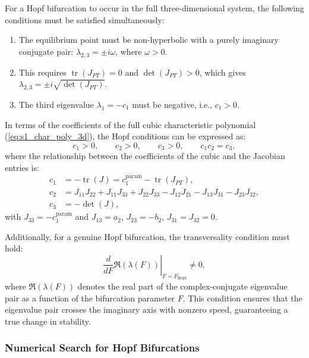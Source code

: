 \documentclass[12pt,a4paper]{article}
\DeclareMathOperator{\tr}{tr}
\begin{document}
For a Hopf bifurcation to occur in the full three-dimensional system, the following conditions must be satisfied simultaneously:

\begin{enumerate}
	\item The equilibrium point must be non-hyperbolic with a purely imaginary conjugate pair: $\lambda_{2,3} = \pm i\omega$, where $\omega > 0$.
	\item This requires $\tr(J_{PT}) = 0$ and $\det(J_{PT}) > 0$, which gives $\lambda_{2,3} = \pm i\sqrt{\det(J_{PT})}$.
	\item The third eigenvalue $\lambda_1 = -c_1$ must be negative, i.e., $c_1 > 0$.
\end{enumerate}

In terms of the coefficients of the full cubic characteristic polynomial (\ref{eq:s1_char_poly_3d}), the Hopf conditions can be expressed as:
\begin{equation}
	c_1 > 0, \qquad c_2 > 0, \qquad c_3 > 0, \qquad c_1 c_2 = c_3,
	\label{eq:s1_hopf_conditions}
\end{equation}
where the relationship between the coefficients of the cubic and the Jacobian entries is:
\begin{equation}
	\begin{aligned}
		c_1 &= -\tr(J) = c_1^{\text{param}} - \tr(J_{PT}), \\
		c_2 &= J_{11}J_{22} + J_{11}J_{33} + J_{22}J_{33} - J_{12}J_{21} - J_{13}J_{31} - J_{23}J_{32}, \\
		c_3 &= -\det(J),
	\end{aligned}
	\label{eq:s1_cubic_coeffs}
\end{equation}
with $J_{33} = -c_1^{\text{param}}$ and $J_{13} = a_2$, $J_{23} = -b_2$, $J_{31}=J_{32}=0$.

Additionally, for a genuine Hopf bifurcation, the transversality condition must hold:
\begin{equation}
	\left. \frac{d}{dF} \Re(\lambda(F)) \right|_{F = F_{\mathrm{Hopf}}} \neq 0,
	\label{eq:s1_transversality}
\end{equation}
where $\Re(\lambda(F))$ denotes the real part of the complex-conjugate eigenvalue pair as a function of the bifurcation parameter $F$. This condition ensures that the eigenvalue pair crosses the imaginary axis with nonzero speed, guaranteeing a true change in stability.

\subsubsection{Numerical Search for Hopf Bifurcations}
\end{document}
